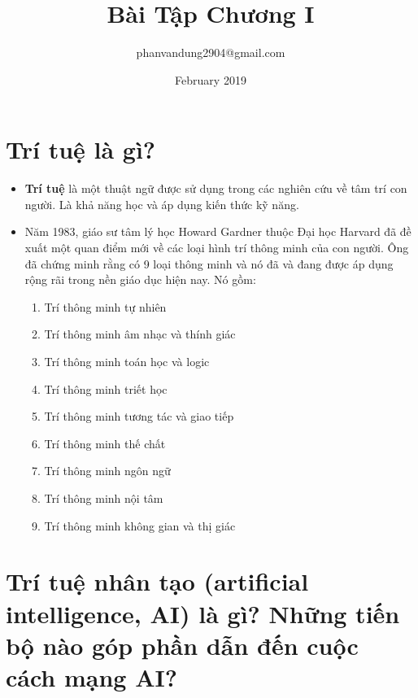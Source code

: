 \documentclass[ebook,12pt,oneside,openany]{memoir}
\title{Bài Tập Chương I}
\author{phanvandung2904@gmail.com}
\date{February 2019}
\begin{document}
\section{Trí tuệ là gì?}

\begin{itemize}
\item \textbf{Trí tuệ}  là một thuật ngữ được sử dụng trong các nghiên cứu về tâm trí con người. Là khả 
năng học và áp dụng kiến thức kỹ năng.
\item  Năm 1983, giáo sư tâm lý học Howard Gardner thuộc Đại học Harvard đã đề xuất một quan điểm mới
về các loại hình trí thông minh của con người.  Ông đã chứng minh rằng có 9 loại thông minh và nó đã và đang được áp dụng rộng rãi trong nền giáo dục hiện nay. Nó gồm: 
    
\begin{enumerate}
\item  Trí thông minh tự nhiên
\item  Trí thông minh âm nhạc và thính giác
\item  Trí thông minh toán học và logic
\item  Trí thông minh triết học
\item  Trí thông minh tương tác và giao tiếp
\item  Trí thông minh thế chất 
\item  Trí thông minh ngôn ngữ
\item  Trí thông minh nội tâm 
\item  Trí thông minh không gian và thị giác
\end{enumerate}

\end{itemize}
    
\section{Trí tuệ nhân tạo (artificial intelligence, AI) là gì? Những tiến bộ nào góp phần dẫn đến cuộc
cách mạng AI?}
\end{document}

